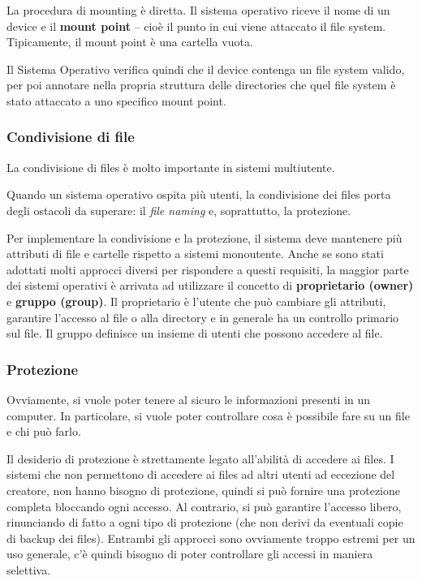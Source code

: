 \documentclass[a4paper]{article}
\begin{document}
La procedura di mounting è diretta. Il sistema operativo riceve il nome di un device e il \textbf{mount point} -- cioè il punto in cui viene attaccato il file system. Tipicamente, il mount point è una cartella vuota.

Il Sistema Operativo verifica quindi che il device contenga un file system valido, per poi annotare nella propria struttura delle directories che quel file system è stato attaccato a uno specifico mount point.

\subsubsection{Condivisione di file}
La condivisione di files è molto importante in sistemi multiutente.

Quando un sistema operativo ospita più utenti, la condivisione dei files porta degli ostacoli da superare: il \textit{file naming} e, soprattutto, la protezione.

Per implementare la condivisione e la protezione, il sistema deve mantenere più attributi di file e cartelle rispetto a sistemi monoutente. Anche se sono stati adottati molti approcci diversi per rispondere a questi requisiti, la maggior parte dei sistemi operativi è arrivata ad utilizzare il concetto di \textbf{proprietario (owner)} e \textbf{gruppo (group)}. Il proprietario è l'utente che può cambiare gli attributi, garantire l'accesso al file o alla directory e in generale ha un controllo primario sul file. Il gruppo definisce un insieme di utenti che possono accedere al file.

\subsubsection{Protezione}
Ovviamente, si vuole poter tenere al sicuro le informazioni presenti in un computer. In particolare, si vuole poter controllare cosa è possibile fare su un file e chi può farlo.

Il desiderio di protezione è strettamente legato all'abilità di accedere ai files. I sistemi che non permettono di accedere ai files ad altri utenti ad eccezione del creatore, non hanno bisogno di protezione, quindi si può fornire una protezione completa bloccando ogni accesso. Al contrario, si può garantire l'accesso libero, rinunciando di fatto a ogni tipo di protezione (che non derivi da eventuali copie di backup dei files). Entrambi gli approcci sono ovviamente troppo estremi per un uso generale, c'è quindi bisogno di poter controllare gli accessi in maniera selettiva.
\end{document}
